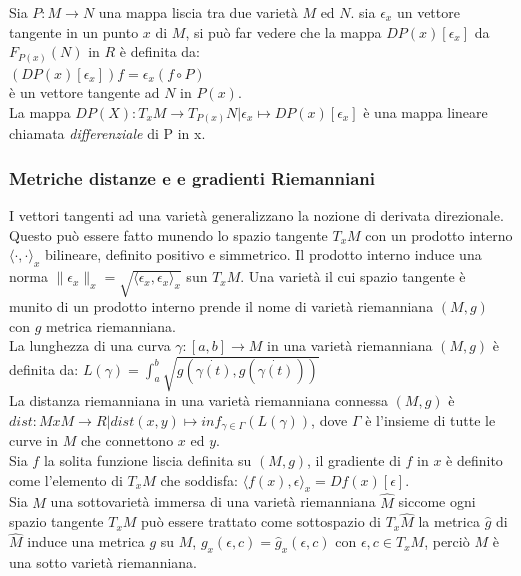 \documentclass[a4paper, 12pt]{article}
\begin{document}
Sia $P:M \to N$ una mappa liscia tra due varietà $M$ ed $N$. sia $\epsilon_x$ un vettore tangente in un punto $x$ di $M$, si può far vedere che la mappa $DP(x)[\epsilon_x]$ da $F_{P(x)}(N)$ in $R$ è definita da:\\
$(DP(x)[\epsilon_x])f = \epsilon_x(f \circ P)$\\
è un vettore tangente ad $N$ in $P(x)$.\\
La mappa $DP(X) : T_xM \to T_{P(x)}N | \epsilon_x \mapsto DP(x)[\epsilon_x]$ è una mappa lineare chiamata \emph{differenziale} di P in x.
\subsubsection{Metriche distanze e e gradienti Riemanniani}
I vettori tangenti ad una varietà generalizzano la nozione di derivata direzionale. Questo può essere fatto munendo lo spazio tangente $T_xM$ con un prodotto interno $\langle \cdot, \cdot \rangle_x$ bilineare, definito positivo e simmetrico. Il prodotto interno induce una norma $\parallel \epsilon_x \parallel_x = \sqrt{\langle \epsilon_x, \epsilon_x \rangle_x}$ sun $T_xM$. Una varietà il cui spazio tangente è munito di un prodotto interno prende il nome di varietà riemanniana $(M, g)$ con $g$ metrica riemanniana.\\
La lunghezza di una curva $\gamma:[a,b] \to M$ in una varietà riemanniana $(M, g)$ è definita da: $L(\gamma) = \int_a^b \sqrt{g(\dot{\gamma (t)}, g(\dot{\gamma (t)}))}$\\
La distanza riemanniana in una varietà riemanniana connessa $(M,g)$ è $dist: MxM \to R | dist(x,y) \mapsto inf_{\gamma \in \Gamma}(L(\gamma))$, dove $\Gamma$ è l'insieme di tutte le curve in $M$ che connettono $x$ ed $y$.\\
Sia $f$ la solita funzione liscia definita su $(M,g)$, il gradiente di $f$ in $x$ è definito come l'elemento di $T_xM$ che soddisfa: $\langle f(x), \epsilon \rangle_x = Df(x)[\epsilon]$.\\
Sia $M$ una sottovarietà immersa di una varietà riemanniana $\hat{M}$ siccome ogni spazio tangente $T_xM$ può essere trattato come sottospazio di $T_x\hat{M}$ la metrica $\hat{g}$ di $\hat{M}$ induce una metrica $g$ su $M$, $g_x(\epsilon, c) = \hat{g}_x(\epsilon, c)$ con $\epsilon, c \in T_xM$, perciò $M$ è una sotto varietà riemanniana.
\end{document}

